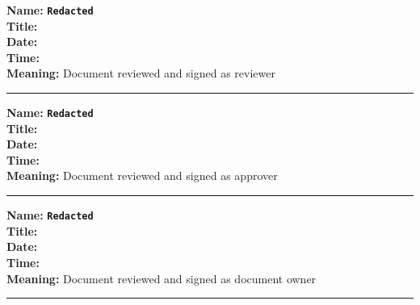 \documentclass[11pt]{article}
\newcommand{\Reviewer}{\textbf{\texttt{Redacted}}}
\newcommand{\Approver}{\textbf{\texttt{Redacted}}}
\newcommand{\DocumentOwner}{\textbf{\texttt{Redacted}}}
\begin{document}
\textbf{Name:} \Reviewer\\
\textbf{Title:} \\
\textbf{Date:} \\
\textbf{Time:} \\
\textbf{Meaning:} Document reviewed and signed as reviewer

\rule{16cm}{0.4pt}

\textbf{Name:} \Approver\\
\textbf{Title:} \\
\textbf{Date:}\\
\textbf{Time:} \\
\textbf{Meaning:} Document reviewed and signed as approver

\rule{16cm}{0.4pt}

\textbf{Name:} \DocumentOwner\\
\textbf{Title:} \\
\textbf{Date:} \\
\textbf{Time:} \\
\textbf{Meaning:} Document reviewed and signed as document owner

\rule{16cm}{0.4pt}
\end{document}

